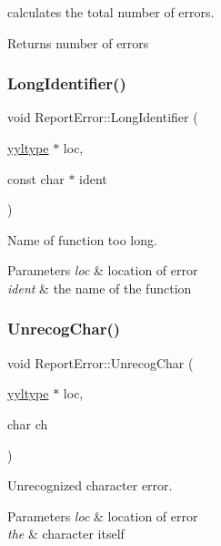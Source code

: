calculates the total number of errors. \begin{DoxyReturn}{Returns}
number of errors 
\end{DoxyReturn}
\mbox{\label{class_report_error_af21c5aee5a4009e032599b34a1066bfc}} 
\subsubsection{\texorpdfstring{Long\+Identifier()}{LongIdentifier()}}
{\footnotesize\ttfamily void Report\+Error\+::\+Long\+Identifier (\begin{DoxyParamCaption}\item[{\hyperlink{structyyltype}{yyltype} $\ast$}]{loc,  }\item[{const char $\ast$}]{ident }\end{DoxyParamCaption})\hspace{0.3cm}{\ttfamily [static]}}

Name of function too long. 
\begin{DoxyParams}{Parameters}
{\em loc} & location of error \\
\hline
{\em ident} & the name of the function \\
\hline
\end{DoxyParams}
\mbox{\label{class_report_error_a8c066b4ee6cd5e854099af3bdaedad39}} 
\subsubsection{\texorpdfstring{Unrecog\+Char()}{UnrecogChar()}}
{\footnotesize\ttfamily void Report\+Error\+::\+Unrecog\+Char (\begin{DoxyParamCaption}\item[{\hyperlink{structyyltype}{yyltype} $\ast$}]{loc,  }\item[{char}]{ch }\end{DoxyParamCaption})\hspace{0.3cm}{\ttfamily [static]}}

Unrecognized character error. 
\begin{DoxyParams}{Parameters}
{\em loc} & location of error \\
\hline
{\em the} & character itself \\
\hline
\end{DoxyParams}
\mbox{\label{class_report_error_a25e0847a7068c5543494a2e0fc6da6eb}} 
